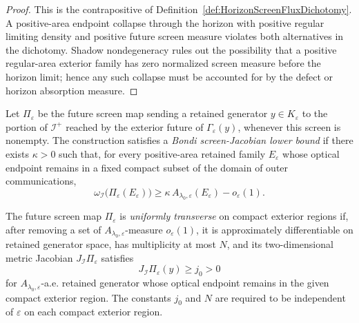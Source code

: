 \begin{proof}
This is the contrapositive of Definition~\ref{def:HorizonScreenFluxDichotomy}. A positive-area endpoint collapse through the horizon with positive regular limiting density and positive future screen measure violates both alternatives in the dichotomy. Shadow nondegeneracy rules out the possibility that a positive regular-area exterior family has zero normalized screen measure before the horizon limit; hence any such collapse must be accounted for by the defect or horizon absorption measure.
\end{proof}

\begin{definition}\label{def:BondiScreenJacobianLowerBound}
Let $\Pi_\varepsilon$ be the future screen map sending a retained generator $y\in K_\varepsilon$ to the portion of $\mathscr I^+$ reached by the exterior future of $\Gamma_\varepsilon(y)$, whenever this screen is nonempty. The construction satisfies a \emph{Bondi screen-Jacobian lower bound} if there exists $\kappa>0$ such that, for every positive-area retained family $E_\varepsilon$ whose optical endpoint remains in a fixed compact subset of the domain of outer communications,
\[
    \omega_{\mathscr I}\bigl(\Pi_\varepsilon(E_\varepsilon)\bigr)
    \ge
    \kappa\,A_{\lambda_0,\varepsilon}(E_\varepsilon)
    -o_\varepsilon(1).
\]
\end{definition}

\begin{definition}\label{def:UniformScreenTransversality}
The future screen map $\Pi_\varepsilon$ is \emph{uniformly transverse} on compact exterior regions if, after removing a set of $A_{\lambda_0,\varepsilon}$-measure $o_\varepsilon(1)$, it is approximately differentiable on retained generator space, has multiplicity at most $N$, and its two-dimensional metric Jacobian $J_{\mathscr I}\Pi_\varepsilon$ satisfies
\[
    J_{\mathscr I}\Pi_\varepsilon(y)\ge j_0>0
\]
for $A_{\lambda_0,\varepsilon}$-a.e. retained generator whose optical endpoint remains in the given compact exterior region. The constants $j_0$ and $N$ are required to be independent of $\varepsilon$ on each compact exterior region.
\end{definition}

